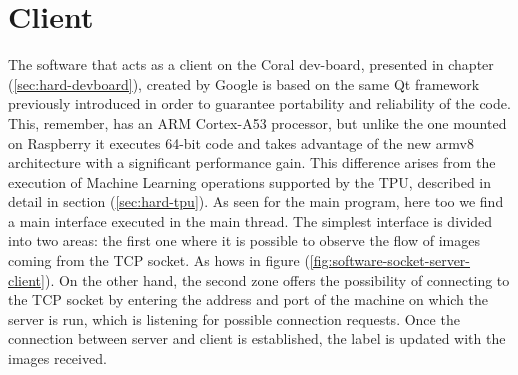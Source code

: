%
\section{Client}
\label{sec:software-coral-intro}
The software that acts as a client on the Coral dev-board, presented in chapter
(\ref{sec:hard-devboard}), created by Google is based on the same Qt framework previously
introduced in order to guarantee portability and reliability of the code. This,
remember, has an ARM Cortex-A53 processor, but unlike the one mounted on
Raspberry it executes 64-bit code and takes advantage of the new armv8
architecture with a significant performance gain. This difference arises from
the execution of Machine Learning operations supported by the TPU, described in
detail in section (\ref{sec:hard-tpu}).
%
As seen for the main program, here too we find a main interface executed in the
main thread. The simplest interface is divided into two areas: the first one
where it is possible to observe the flow of images coming from the TCP socket. As hows in figure (\ref{fig:software-socket-server-client}).\hfill \break
On the other hand, the second zone offers the possibility of
connecting to the TCP socket by entering the address and port of the machine on
which the server is run, which is listening for possible connection requests.
Once the connection between server and client is established, the label is
updated with the images received.
%
%
%
